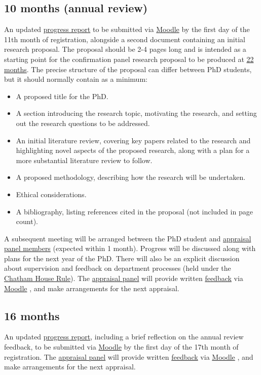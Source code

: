 \documentclass[12pt,a4paper]{article}
\begin{document}
\subsection{10 months (annual review)} \label{sec:10months}
An updated \hyperref[sec:report]{progress report} to be submitted via \href{https://modules.lancaster.ac.uk/course/view.php?id=7050}{Moodle}  by the first day of the 11th month of registration, alongside a second document containing an initial research proposal. The proposal should be 2-4 pages long and is intended as a starting point for the confirmation panel research proposal to be produced at \hyperref[sec:22months]{22 months}. The precise structure of the proposal can differ between PhD students, but it should normally contain as a minimum:
\begin{itemize}
	\item A proposed title for the PhD.
	\item A section introducing the research topic, motivating the research, and setting out the research questions to be addressed.
	\item An initial literature review, covering key papers related to the research and highlighting novel aspects of the proposed research, along with a plan for a more substantial literature review to follow.
	\item A proposed methodology, describing how the research will be undertaken.
	\item Ethical considerations.
	\item A bibliography, listing references cited in the proposal (not included in page count).
\end{itemize}

A subsequent meeting will be arranged between the PhD student and \hyperref[sec:panel]{appraisal panel members} (expected within 1 month). Progress will be discussed along with plans for the next year of the PhD. There will also be an explicit discussion about supervision and feedback on department processes (held under the \href{https://www.chathamhouse.org/chatham-house-rule}{Chatham House Rule}). The \hyperref[sec:panel]{appraisal panel} will provide written \hyperref[sec:feedback]{feedback} via \href{https://modules.lancaster.ac.uk/course/view.php?id=7050}{Moodle} , and make arrangements for the next appraisal.

\subsection{16 months} \label{sec:16months}
An updated \hyperref[sec:report]{progress report}, including a brief reflection on the annual review feedback, to be submitted via \href{https://modules.lancaster.ac.uk/course/view.php?id=7050}{Moodle}  by the first day of the 17th month of registration. The \hyperref[sec:panel]{appraisal panel} will provide written \hyperref[sec:feedback]{feedback} via \href{https://modules.lancaster.ac.uk/course/view.php?id=7050}{Moodle} , and make arrangements for the next appraisal.
\end{document}

